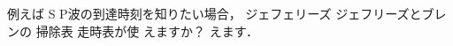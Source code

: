 \documentclass{ltjsarticle}
\providecommand{\DIFadd}[1]{{\protect\color{blue} \sf #1}} %
\providecommand{\DIFdel}[1]{{\protect\color{red} \scriptsize #1}} %
\providecommand{\DIFaddbegin}{} %
\providecommand{\DIFaddend}{} %
\providecommand{\DIFdelbegin}{} %
\providecommand{\DIFdelend}{} %
\begin{document}
例えば\DIFdelbegin \DIFdel{S}\DIFdelend \DIFaddbegin \DIFadd{P}\DIFaddend 波の到達時刻を知りたい場合，\DIFdelbegin \DIFdel{ジェフェリーズ}\DIFdelend \DIFaddbegin \DIFadd{ジェフリーズ}\DIFaddend とブレンの\DIFdelbegin \DIFdel{掃除表}\DIFdelend \DIFaddbegin \DIFadd{走時表}\DIFaddend が使\DIFdelbegin \DIFdel{えますか？
}\DIFdelend \DIFaddbegin \DIFadd{えます．
}\DIFaddend 
\end{document}
